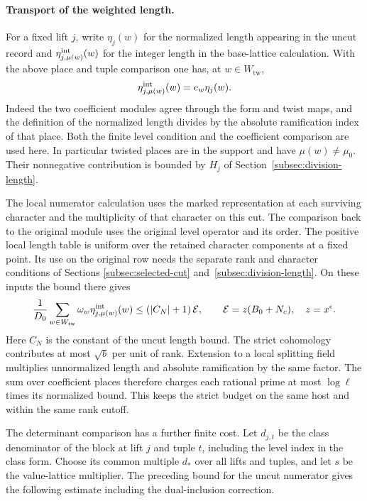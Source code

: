 \paragraph{Transport of the weighted length.}
For a fixed lift \(j\), write \(\eta_j(w)\) for the
normalized length appearing in the uncut record and
\(\eta^{\rm int}_{j,\mu(w)}(w)\) for the integer length in
the base-lattice calculation. With the above place and
tuple comparison one has, at \(w\in W_{\mathrm{tw}}\),
\[
     \eta^{\rm int}_{j,\mu(w)}(w)=e_w\eta_j(w).
\]
Indeed the two coefficient modules agree through the
form and twist maps, and the definition of the normalized
length divides by the absolute ramification index of
that place. Both the finite level condition and the
coefficient comparison are used here. In particular
twisted places are in the support and have \(\mu(w)\ne\mu_0\).
Their nonnegative contribution is bounded by \(H_j\)
of Section~\ref{subsec:division-length}.

The local numerator calculation uses the marked
representation at each surviving character and the
multiplicity of that character on this cut. The comparison
back to the original module uses the original level
operator and its order. The positive local length table
is uniform over the retained character components at a fixed
point. Its use on the original row needs the separate
rank and character conditions of Sections
\ref{subsec:selected-cut} and~\ref{subsec:division-length}.
On these inputs the bound there gives
\[
  \frac{1}{D_0}
    \sum_{w\in W_{\mathrm{tw}}}\omega_w
                          \eta^{\rm int}_{j,\mu(w)}(w)
        \le (|C_N|+1)\,\mathcal E ,
       \qquad \mathcal E=z(B_0+N_c),\quad z=x^\epsilon .
\]
Here \(C_N\) is the constant of the uncut length bound.
The strict cohomology contributes at most \(\sqrt b\)
per unit of rank. Extension to a local splitting field
multiplies unnormalized length and absolute ramification
by the same factor. The sum over coefficient places
therefore charges each rational prime at most \(\log\ell\)
times its normalized bound. This keeps the strict budget
on the same host and within the same rank cutoff.

The determinant comparison has a further finite cost.
Let \(d_{j,t}\) be the class denominator of the block at
lift \(j\) and tuple \(t\), including the level index in the
class form. Choose its common multiple \(d_*\) over
all lifts and tuples, and let \(s\) be the value-lattice
multiplier. The preceding bound for the uncut numerator gives the
following estimate including the dual-inclusion correction.

